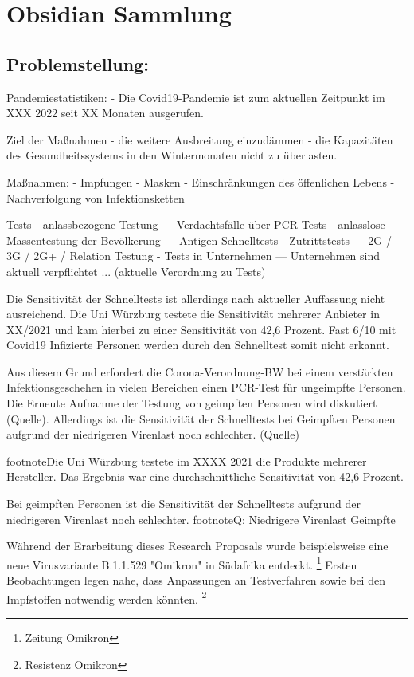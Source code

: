 \section{Obsidian Sammlung}
\subsection{Problemstellung:}
Pandemiestatistiken:
- Die Covid19-Pandemie ist zum aktuellen Zeitpunkt im XXX 2022 seit XX Monaten ausgerufen.

Ziel der Maßnahmen
- die weitere Ausbreitung einzudämmen
- die Kapazitäten des Gesundheitssystems in den Wintermonaten nicht zu überlasten.

Maßnahmen:
- Impfungen
- Masken
- Einschränkungen des öffenlichen Lebens
- Nachverfolgung von Infektionsketten

Tests
- anlassbezogene Testung
--- Verdachtsfälle über PCR-Tests
- anlasslose Massentestung der Bevölkerung
--- Antigen-Schnelltests
- Zutrittstests
--- 2G / 3G / 2G+ / Relation Testung
- Tests in Unternehmen
--- Unternehmen sind aktuell verpflichtet ... (aktuelle Verordnung zu Tests)

Die Sensitivität der Schnelltests ist allerdings nach aktueller Auffassung nicht ausreichend. Die Uni Würzburg testete die Sensitivität mehrerer Anbieter in XX/2021 und kam hierbei zu einer Sensitivität von 42,6 Prozent. Fast 6/10 mit Covid19 Infizierte Personen werden durch den Schnelltest somit nicht erkannt.

Aus diesem Grund erfordert die Corona-Verordnung-BW bei einem verstärkten Infektionsgeschehen in vielen Bereichen einen PCR-Test für ungeimpfte Personen. Die Erneute Aufnahme der Testung von geimpften Personen wird diskutiert (Quelle). Allerdings ist die Sensitivität der Schnelltests bei Geimpften Personen aufgrund der niedrigeren Virenlast noch schlechter. (Quelle)

footnote{Die Uni Würzburg testete im XXXX 2021 die Produkte mehrerer Hersteller.
	Das Ergebnis war eine durchschnittliche Sensitivität von 42,6 Prozent.}

Bei geimpften Personen ist die Sensitivität der Schnelltests aufgrund der niedrigeren Virenlast noch schlechter.
footnote{Q: Niedrigere Virenlast Geimpfte}

Während der Erarbeitung dieses Research Proposals wurde beispielsweise eine neue Virusvariante B.1.1.529 "Omikron" in Südafrika entdeckt.
\footnote{Zeitung Omikron}
Ersten Beobachtungen legen nahe, dass Anpassungen an Testverfahren sowie bei den Impfstoffen notwendig werden könnten.
\footnote{Resistenz Omikron}

